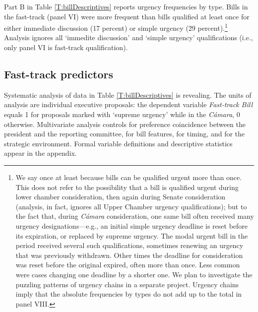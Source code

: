 \documentclass[letter,12pt]{article}
\begin{document}
Part B in Table \ref{T:billDescriptives} reports urgency frequencies by type. Bills in the fast-track (panel VI) were more frequent than bills qualified at least once for either immediate discussion (17 percent) or simple urgency (29 percent).\footnote{\label{fnNonExclusive}We say once at least because bills can be qualified urgent more than once. This does not refer to the possibility that a bill is qualified urgent during lower chamber consideration, then again during Senate consideration (analysis, in fact, ignores all Upper Chamber urgency qualifications); but to the fact that, during \emph{Cámara} consideration, one same bill often received many urgency designations---e.g., an initial simple urgency deadline is reset before its expiration, or replaced by supreme urgency. The modal urgent bill in the period received several such qualifications, sometimes renewing an urgency that was previously withdrawn. Other times the deadline for consideration was reset before the original expired, often more than once. Less common were cases changing one deadline by a shorter one. We plan to investigate the puzzling patterns of urgency chains in a separate project. Urgency chains imply that the absolute frequencies by types do not add up to the total in panel VIII.} Analysis ignores all `immedite discussion' and `simple urgency' qualifications (i.e., only panel VI is fast-track qualification). 

\subsection{Fast-track predictors}

Systematic analysis of data in Table \ref{T:billDescriptives} is revealing. The units of analysis are individual executive proposals: the dependent variable \emph{Fast-track Bill} equals 1 for proposals marked with `supreme urgency' while in the \emph{Cámara}, 0 otherwise. Multivariate analysis controls for preference coincidence between the president and the reporting committee, for bill features, for timing, and for the strategic environment. Formal variable definitions and descriptive statistics appear in the appendix.
\end{document}
